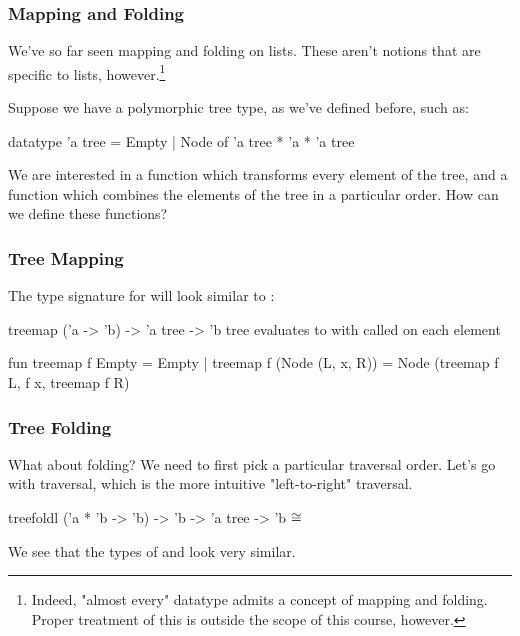 \documentclass[aspectratio=169]{beamer}
\begin{document}
\begin{frame}[fragile]
  \frametitle{Mapping and Folding}

  \tgs

  We've so far seen mapping and folding on lists. These aren't notions that are
  specific to lists, however.\footnote{
    Indeed, "almost every" datatype admits a concept of mapping and
    folding. Proper treatment of this is outside the scope of this course, however.
  }

  \pause
  \vspace{\fill}

  Suppose we have a polymorphic tree type, as we've defined before, such as:
  \begin{codeblock}
    datatype 'a tree = Empty | Node of 'a tree * 'a * 'a tree
  \end{codeblock}

  \pause
  \vspace{\fill}

  We are interested in a  function which transforms every element of the
  tree, and a  function which combines the elements of the tree in a
  particular order. How can we define these functions?

\end{frame}

\begin{frame}[fragile]
  \frametitle{Tree Mapping}

  The type signature for  will look similar to :

  \pause
  \vspace{\fill}

  \spec
    {treemap}
    {('a -> 'b) -> 'a tree -> 'b tree}
    {}
    { evaluates to  with  called on
    each element}

  \pause
  \vspace{\fill}

  \begin{codeblock}
    fun treemap f Empty = Empty
      | treemap f (Node (L, x, R)) =
          Node (treemap f L, f x, treemap f R)
  \end{codeblock}
\end{frame}

\begin{frame}[fragile]
  \frametitle{Tree Folding}

  What about folding? We need to first pick a particular traversal order. Let's
  go with  traversal, which is the more intuitive "left-to-right"
  traversal.

  \pause
  \vspace{\fill}

  \spec
    {treefoldl}
    {('a * 'b -> 'b) -> 'b -> 'a tree -> 'b}
    {}
    { $\cong$ }

  \pause
  \vspace{\fill}

  We see that the types of  and  look very
  similar.
\end{frame}
\end{document}

